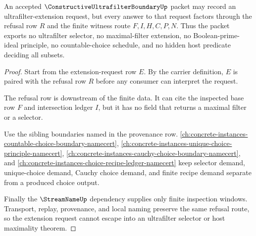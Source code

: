 \begin{theorem}
\label{thm:constructive-ultrafilter-boundary-no-ultrafilter-selector}
An accepted $\ConstructiveUltrafilterBoundaryUp$ packet may record an ultrafilter-extension request, but every answer to that request factors through the refusal row $R$ and the finite witness route $F,I,H,C,P,N$. Thus the packet exports no ultrafilter selector, no maximal-filter extension, no Boolean-prime-ideal principle, no countable-choice schedule, and no hidden host predicate deciding all subsets.
\end{theorem}
\begin{proof}
Start from the extension-request row $E$. By the carrier definition, $E$ is paired with the refusal row $R$ before any consumer can interpret the request.

The refusal row is downstream of the finite data. It can cite the inspected base row $F$ and intersection ledger $I$, but it has no field that returns a maximal filter or a selector.

Use the sibling boundaries named in the provenance row. \autoref{ch:concrete-instances-countable-choice-boundary-namecert}, \autoref{ch:concrete-instances-unique-choice-principle-namecert}, \autoref{ch:concrete-instances-cauchy-choice-boundary-namecert}, and \autoref{ch:concrete-instances-choice-recipe-ledger-namecert} keep selector demand, unique-choice demand, Cauchy choice demand, and finite recipe demand separate from a produced choice output.

Finally the $\StreamNameUp$ dependency supplies only finite inspection windows. Transport, replay, provenance, and local naming preserve the same refusal route, so the extension request cannot escape into an ultrafilter selector or host maximality theorem.
\end{proof}



